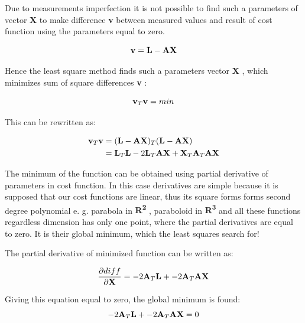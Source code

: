 \documentclass[a4paper,12pt]{report}
\newcommand{\ematr}[1]{
{\bf #1}
}
\newcommand{\evect}[1]{
{\bf #1}
}
\newcommand{\eucl}[1]{
{\bf R\textsuperscript{#1}}
}
\begin{document}
Due to measurements imperfection it is not possible to find such a parameters of vector \evect{X} to make difference \evect{v} between measured values and 
result of cost function using the parameters equal to zero. 

\begin{equation}
\label{eq:least_v}
\evect{v} = \evect{L} - \ematr{A}\evect{X}
\end{equation} 


Hence the least square method finds such a parameters vector \evect{X}, which minimizes 
sum of square differences \evect{v}: 

\begin{equation}
\evect{v}_{T} \evect{v} = min
\end{equation} 


This can be rewritten as:

\begin{equation}
\begin{split}
\evect{v}_{T} \evect{v} &= (\evect{L} - \ematr{A}\ematr{X})_{T} (\evect{L} - \ematr{A}\ematr{X}) \\
&= \evect{L}_{T} \evect{L} - 2 \evect{L}_{T} \ematr{A} \evect{X} + \evect{X}_{T} \ematr{A}_{T} \ematr{A} \evect{X}
\label{eq:least_be_part}
\end{split}
\end{equation} 

The minimum of the function can be obtained using partial derivative of parameters in cost function.
In this case derivatives are simple because it is supposed that our cost functions are linear, thus 
its square forms forms  second degree polynomial e. g. parabola in \eucl{2}, paraboloid in \eucl{3} and all these functions 
regardless dimension has only one point, where the partial derivatives are equal to zero. It is 
their global minimum, which the least squares search for!

The partial derivative of minimized function can be written as:
 
\begin{equation}
\frac{\partial diff}{\partial \evect{X}} = -2\ematr{A}_{T} \evect{L} + -2\ematr{A}_{T}\ematr{A} \evect{X} 
\label{eq:least_part}
\end{equation} 

Giving this equation equal to zero, the global minimum is found:
\begin{equation}
-2\ematr{A}_{T} \evect{L} + -2\ematr{A}_{T}\ematr{A} \evect{X} = 0 
\end{equation} 
\end{document}
